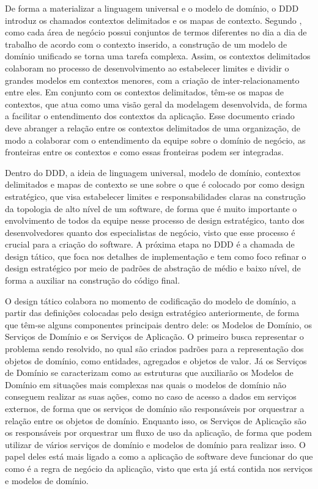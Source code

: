 \documentclass[12pt, %
openright, 
oneside, %
a4paper,    %
brazil]{facom-ufu-abntex2}
\begin{document}
De forma a materializar a linguagem universal e o modelo de domínio, o DDD introduz os chamados contextos delimitados e os mapas de contexto. Segundo , como cada área de negócio possui conjuntos de termos diferentes no dia a dia de trabalho de acordo com o contexto inserido, a construção de um modelo de domínio unificado se torna uma tarefa complexa. Assim, os contextos delimitados colaboram no processo de desenvolvimento ao estabelecer limites e dividir o grandes modelos em contextos menores, com a criação de inter-relacionamento entre eles. Em conjunto com os contextos delimitados, têm-se os mapas de contextos, que atua como uma visão geral da modelagem desenvolvida, de forma a facilitar o entendimento dos contextos da aplicação. Esse documento criado deve abranger a relação entre os contextos delimitados de uma organização, de modo a colaborar com o entendimento da equipe sobre o domínio de negócio, as fronteiras entre os contextos e como essas fronteiras podem ser integradas.

Dentro do DDD, a ideia de linguagem universal, modelo de domínio, contextos delimitados e mapas de contexto se une sobre o que é colocado por  como design estratégico, que visa estabelecer limites e responsabilidades claras na construção da topologia de alto nível de um software, de forma que é muito importante o envolvimento de todos da equipe nesse processo de design estratégico, tanto dos desenvolvedores quanto dos especialistas de negócio, visto que esse processo é crucial para a criação do software. A próxima etapa no DDD é a chamada de design tático, que foca nos detalhes de implementação e tem como foco refinar o design estratégico por meio de padrões de abstração de médio e baixo nível, de forma a auxiliar na construção do código final.

O design tático colabora no momento de codificação do modelo de domínio, a partir das definições colocadas pelo design estratégico anteriormente, de forma que têm-se alguns componentes principais dentro dele: os Modelos de Domínio, os Serviços de Domínio e os Serviços de Aplicação. O primeiro busca representar o problema sendo resolvido, no qual são criados padrões para a representação dos objetos de domínio, como entidades, agregados e objetos de valor. Já os Serviços de Domínio se caracterizam como as estruturas que auxiliarão os Modelos de Domínio em situações mais complexas nas quais o modelos de domínio não conseguem realizar as suas ações, como no caso de acesso a dados em serviços externos, de forma que os serviços de domínio são responsáveis por orquestrar a relação entre os objetos de domínio. Enquanto isso, os Serviços de Aplicação são os responsáveis por orquestrar um fluxo de uso da aplicação, de forma que podem utilizar de vários serviços de domínio e modelos de domínio para realizar isso. O papel deles está mais ligado a como a aplicação de software deve funcionar do que como é a regra de negócio da aplicação, visto que esta já está contida nos serviços e modelos de domínio.
\end{document}
